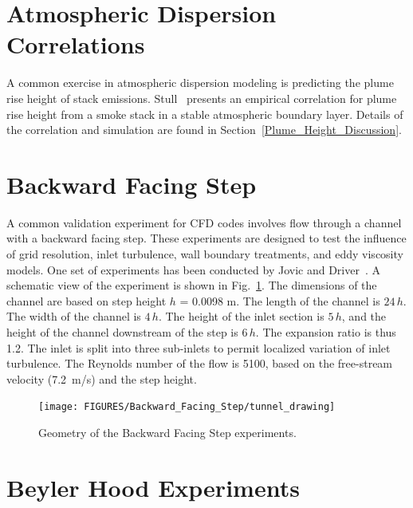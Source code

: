 \section{Atmospheric Dispersion Correlations}
\label{Atmospheric_Dispersion_Description}

A common exercise in atmospheric dispersion modeling is predicting the plume rise height of stack emissions. Stull~\cite{Stull:2000} presents an empirical correlation for plume rise height from a smoke stack in a stable atmospheric boundary layer. Details of the correlation and simulation are found in Section~\ref{Plume_Height_Discussion}.



\section{Backward Facing Step}
\label{Backward_Facing_Step_Description}

A common validation experiment for CFD codes involves flow through a channel with a backward facing step. These experiments are designed to test the influence of grid resolution, inlet turbulence, wall boundary treatments, and eddy viscosity models. One set of experiments has been conducted by Jovic and Driver~\cite{JD:1994}.  A schematic view of the experiment is shown in Fig.~\ref{tunnel_drawing}. The dimensions of the channel are based on step height $h$ = 0.0098 m.  The length of the channel is $24 \, h$. The width of the channel is $4 \, h$. The height of the inlet section is $5 \, h$, and the height of the channel downstream of the step is $6 \, h$. The expansion ratio is thus 1.2.  The inlet is split into three sub-inlets to permit localized variation of inlet turbulence.  The Reynolds number of the flow is 5100, based on the free-stream velocity (7.2~m/s) and the step height.

\begin{figure}[!ht]
\texttt{[image: FIGURES/Backward\_Facing\_Step/tunnel\_drawing]}
\caption[Geometry of the Backward Facing Step experiments]{Geometry of the Backward Facing Step experiments.}
\label{tunnel_drawing}
\end{figure}


\section{Beyler Hood Experiments}
\label{Beyler_Hood_Description}

